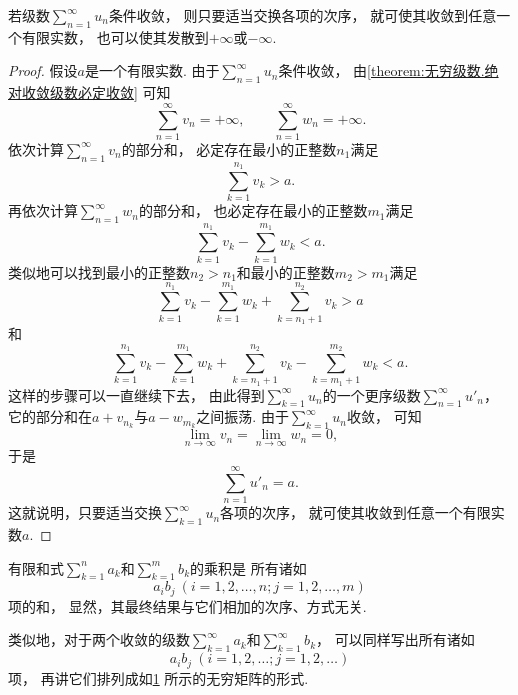 \begin{theorem}[条件收敛级数的黎曼定理]
若级数\(\sum_{n=1}^\infty u_n\)条件收敛，
则只要适当交换各项的次序，
就可使其收敛到任意一个有限实数，
也可以使其发散到\(+\infty\)或\(-\infty\).
\begin{proof}
假设\(a\)是一个有限实数.
由于\(\sum_{n=1}^\infty u_n\)条件收敛，
由\cref{theorem:无穷级数.绝对收敛级数必定收敛} 可知\[
	\sum_{n=1}^\infty v_n = +\infty,
	\qquad
	\sum_{n=1}^\infty w_n = +\infty.
\]
依次计算\(\sum_{n=1}^\infty v_n\)的部分和，
必定存在最小的正整数\(n_1\)满足\[
	\sum_{k=1}^{n_1} v_k > a.
\]
再依次计算\(\sum_{n=1}^\infty w_n\)的部分和，
也必定存在最小的正整数\(m_1\)满足\[
	\sum_{k=1}^{n_1} v_k
	- \sum_{k=1}^{m_1} w_k
	< a.
\]
类似地可以找到最小的正整数\(n_2>n_1\)和最小的正整数\(m_2>m_1\)满足\[
	\sum_{k=1}^{n_1} v_k
	- \sum_{k=1}^{m_1} w_k
	+ \sum_{k=n_1+1}^{n_2} v_k
	> a
\]和\[
	\sum_{k=1}^{n_1} v_k
	- \sum_{k=1}^{m_1} w_k
	+ \sum_{k=n_1+1}^{n_2} v_k
	- \sum_{k=m_1+1}^{m_2} w_k
	< a.
\]
这样的步骤可以一直继续下去，
由此得到\(\sum_{k=1}^\infty u_n\)的一个更序级数\(\sum_{n=1}^\infty u'_n\)，
它的部分和在\(a + v_{n_k}\)与\(a - w_{m_k}\)之间振荡.
由于\(\sum_{k=1}^\infty u_n\)收敛，
可知\[
	\lim_{n\to\infty} v_n
	= \lim_{n\to\infty} w_n
	= 0,
\]
于是\[
	\sum_{n=1}^\infty u'_n = a.
\]
这就说明，只要适当交换\(\sum_{k=1}^\infty u_n\)各项的次序，
就可使其收敛到任意一个有限实数\(a\).
\end{proof}
\end{theorem}

有限和式\(\sum_{k=1}^n a_k\)和\(\sum_{k=1}^m b_k\)的乘积是
所有诸如\[
	a_i b_j\ (i=1,2,\dotsc,n;j=1,2,\dotsc,m)
\]项的和，
显然，其最终结果与它们相加的次序、方式无关.

类似地，对于两个收敛的级数\(\sum_{k=1}^\infty a_k\)和\(\sum_{k=1}^\infty b_k\)，
可以同样写出所有诸如\[
	a_i b_j\ (i=1,2,\dotsc;j=1,2,\dotsc)
\]项，
再讲它们排列成如\cref{figure:无穷级数.无穷级数乘积各项的矩阵} 所示的无穷矩阵的形式.
\begin{figure}[htb]
	\centering
	\def\term#1#2{\draw({\number#2-1},{1-\number#1})node{$a_#1 b_#2$};}
	\caption{}
	\label{figure:无穷级数.无穷级数乘积各项的矩阵}
\end{figure}


